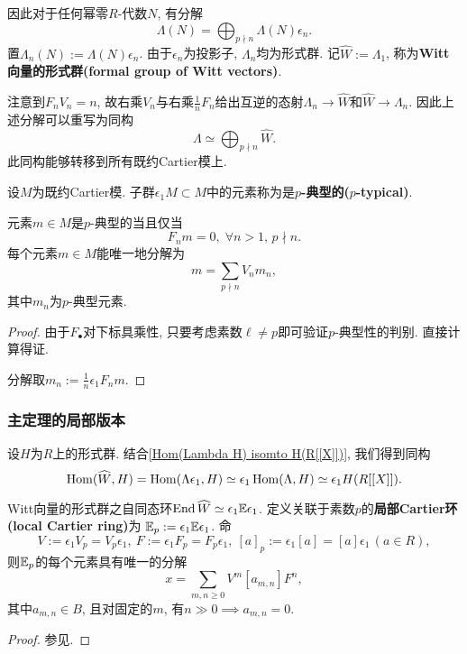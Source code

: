 因此对于任何幂零$R$-代数$N$, 有分解\[\Lambda(N) = \bigoplus_{p\nmid n}\Lambda(N)\epsilon_n.\]
置$\Lambda_n(N) := \Lambda(N)\epsilon_n$.
由于$\epsilon_n$为投影子, $\Lambda_n$均为形式群.
记$\hat{W} := \Lambda_1$, 称为\textbf{Witt向量的形式群(formal group of Witt vectors)}.

注意到$F_nV_n = n$, 故右乘$V_n$与右乘$\frac{1}{n}F_n$给出互逆的态射$\Lambda_n\to\hat{W}$和$\hat{W}\to\Lambda_n$.
因此上述分解可以重写为同构\[\Lambda\simeq\bigoplus_{p\nmid n}\hat{W}.\]
此同构能够转移到所有既约Cartier模上.
\begin{definition}
    设$M$为既约Cartier模. 子群$\epsilon_1M\subset M$中的元素称为是\textbf{$p$-典型的($p$-typical)}.
\end{definition}
\begin{theorem}
    元素$m\in M$是$p$-典型的当且仅当\[F_nm = 0,\;\forall n > 1,\, p\nmid n.\]
    每个元素$m\in M$能唯一地分解为\[m = \sum_{p\nmid n} V_nm_n,\]
    其中$m_n$为$p$-典型元素.
\end{theorem}
\begin{proof}
    由于$F_{\bullet}$对下标具乘性, 只要考虑素数$\ell\neq p$即可验证$p$-典型性的判别. 直接计算得证.

    分解取$m_n := \frac{1}{n}\epsilon_1 F_nm$.
\end{proof}

\subsubsection{主定理的局部版本}

设$H$为$R$上的形式群.
结合\cref{Hom(Lambda H) isomto H(R[[X]])}, 我们得到同构
\[\operatorname{Hom}(\widehat{W}, H) = \operatorname{Hom}(\Lambda\epsilon_1, H) \simeq \epsilon_1\operatorname{Hom}(\Lambda, H)\simeq\epsilon_1 H(R[[X]]).\]

\begin{defprop}
    Witt向量的形式群之自同态环$\operatorname{End} \widehat{W}\simeq \epsilon_1\mathbb{E}\epsilon_1$.
    定义关联于素数$p$的\textbf{局部Cartier环(local Cartier ring)}为
    $\mathbb{E}_p := \epsilon_1\mathbb{E}\epsilon_1$. 命\[V := \epsilon_1V_p = V_p\epsilon_1,\ F := \epsilon_1F_p = F_p\epsilon_1,\ [a]_p := \epsilon_1[a] = [a]\epsilon_1\, (a\in R),\]
    则$\mathbb{E}_p$的每个元素具有唯一的分解\[x = \sum_{m, n\ge 0} V^m [a_{m, n}] F^n,\] 其中$a_{m, n}\in B$, 且对固定的$m$, 有$n\gg 0\implies a_{m, n} = 0$.
\end{defprop}
\begin{proof}
    参见\cite[Definition and Theorem 4.17]{Zi84}.
\end{proof}

